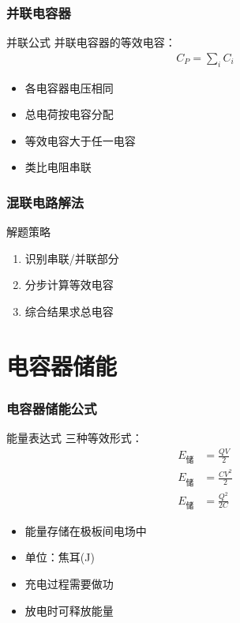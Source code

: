 \documentclass{beamer}
\begin{document}
\begin{frame}
    \frametitle{并联电容器}
    
    \begin{block}{并联公式}
        并联电容器的等效电容：
        \begin{align}
            C_P = \sum_i C_i
        \end{align}
    \end{block}
    
    \begin{itemize}
        \item 各电容器电压相同
        \item 总电荷按电容分配
        \item 等效电容大于任一电容
        \item 类比电阻串联
    \end{itemize}
\end{frame}

\begin{frame}
    \frametitle{混联电路解法}
    
    \begin{block}{解题策略}
        \begin{enumerate}
            \item 识别串联/并联部分
            \item 分步计算等效电容
            \item 综合结果求总电容
        \end{enumerate}
    \end{block}
\end{frame}

\section{电容器储能}

\begin{frame}
    \frametitle{电容器储能公式}
    
    \begin{block}{能量表达式}
        三种等效形式：
        \begin{align}
            E_{储} &= \frac{QV}{2} \\
            E_{储} &= \frac{CV^2}{2} \\
            E_{储} &= \frac{Q^2}{2C}
        \end{align}
    \end{block}
    
    \begin{itemize}
        \item 能量存储在极板间电场中
        \item 单位：焦耳(J)
        \item 充电过程需要做功
        \item 放电时可释放能量
    \end{itemize}
\end{frame}
\end{document}
